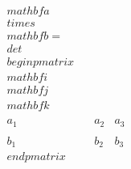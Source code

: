 \documentclass[preview]{standalone}
\begin{document}
\begin{align*}
\quad\\mathbf{a} \quad\\times \quad\\mathbf{b} = \quad\\det \quad\\begin{pmatrix} \quad\\mathbf{i} & \quad\\mathbf{j} & \quad\\mathbf{k} \quad\\\quad\\ a_1 & a_2 & a_3 \quad\\\quad\\ b_1 & b_2 & b_3 \quad\\end{pmatrix}
\end{align*}
\end{document}
